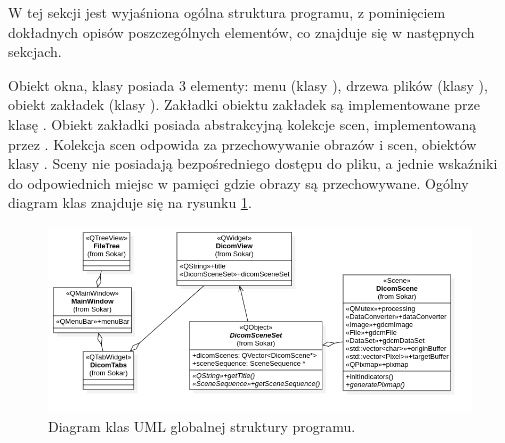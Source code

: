 
\par
W tej sekcji jest wyjaśniona ogólna struktura programu, z pominięciem dokładnych opisów poszczególnych elementów, co znajduje się w następnych sekcjach.
\par
Obiekt okna, klasy  posiada 3 elementy: menu (klasy ), drzewa plików (klasy ), obiekt zakładek (klasy ).
Zakładki obiektu zakładek są implementowane prze klasę .
Obiekt zakładki posiada abstrakcyjną kolekcje scen, implementowaną przez .
Kolekcja scen odpowida za przechowywanie obrazów i scen, obiektów klasy .
Sceny nie posiadają bezpośredniego dostępu do pliku, a jednie wskaźniki do odpowiednich miejsc w pamięci gdzie obrazy są przechowywane.
Ogólny diagram klas znajduje się na rysunku \ref{fig:uml-global-sturcture}.

\begin{figure}[!htbp]
    \centering
    \includegraphics[width=\textwidth]{img/uml/global-sturcture.png}
    \caption{Diagram klas UML globalnej struktury programu.}
    \label{fig:uml-global-sturcture}
\end{figure}
